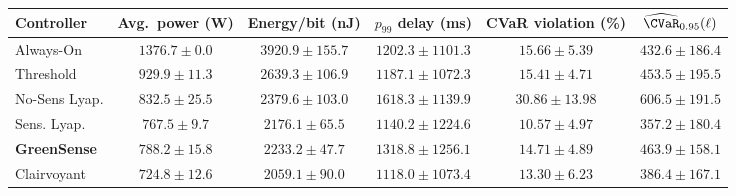 \begin{tabular}{lccccc}
\toprule
Controller & Avg.\ power (W) & Energy/bit (nJ) & $p_{99}$ delay (ms) & CVaR violation (\%) & $\widehat{\CVaR}_{0.95}(\ell)$ \\
\midrule
Always-On & $1376.7\!\pm\!0.0$ & $3920.9\!\pm\!155.7$ & $1202.3\!\pm\!1101.3$ & $15.66\!\pm\!5.39$ & $432.6\!\pm\!186.4$ \\
Threshold & $929.9\!\pm\!11.3$ & $2639.3\!\pm\!106.9$ & $1187.1\!\pm\!1072.3$ & $15.41\!\pm\!4.71$ & $453.5\!\pm\!195.5$ \\
No-Sens Lyap. & $832.5\!\pm\!25.5$ & $2379.6\!\pm\!103.0$ & $1618.3\!\pm\!1139.9$ & $30.86\!\pm\!13.98$ & $606.5\!\pm\!191.5$ \\
Sens. Lyap. & $767.5\!\pm\!9.7$ & $2176.1\!\pm\!65.5$ & $1140.2\!\pm\!1224.6$ & $10.57\!\pm\!4.97$ & $357.2\!\pm\!180.4$ \\
\textbf{GreenSense} & $\mathbf{788.2\!\pm\!15.8}$ & $\mathbf{2233.2\!\pm\!47.7}$ & $\mathbf{1318.8\!\pm\!1256.1}$ & $\mathbf{14.71\!\pm\!4.89}$ & $\mathbf{463.9\!\pm\!158.1}$ \\
Clairvoyant & $724.8\!\pm\!12.6$ & $2059.1\!\pm\!90.0$ & $1118.0\!\pm\!1073.4$ & $13.30\!\pm\!6.23$ & $386.4\!\pm\!167.1$ \\
\bottomrule
\end{tabular}
